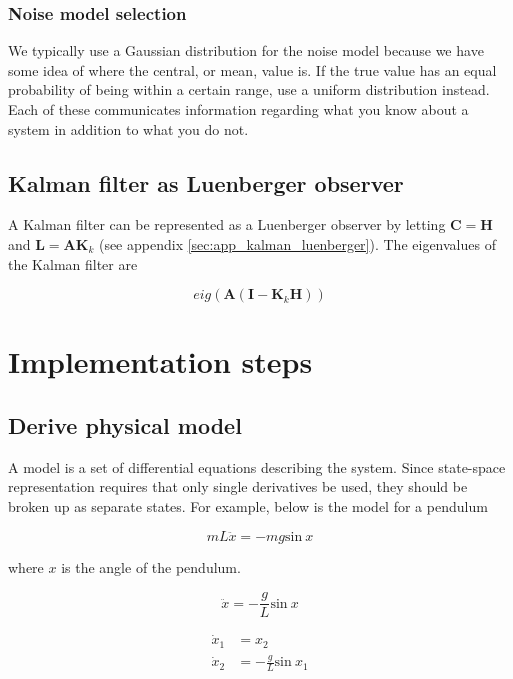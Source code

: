 \documentclass[10pt,conference,compsoc]{IEEEtran}
\newcommand{\mtx}[1] {\bm #1}
\begin{document}
\subsubsection{Noise model selection}

\noindent We typically use a Gaussian distribution for the noise model because
we have some idea of where the central, or mean, value is. If the true value has
an equal probability of being within a certain range, use a uniform distribution
instead. Each of these communicates information regarding what you know about a
system in addition to what you do not.

\subsection{Kalman filter as Luenberger observer}

\noindent A Kalman filter can be represented as a Luenberger observer by letting
$\mtx{C} = \mtx{H}$ and $\mtx{L} = \mtx{A} \mtx{K}_k$ (see appendix
\ref{sec:app_kalman_luenberger}). The eigenvalues of the Kalman filter are

\begin{equation}
  eig(\mtx{A}(\mtx{I} - \mtx{K}_k\mtx{H}))
\end{equation}

\section{Implementation steps}

\subsection{Derive physical model}

\noindent A model is a set of differential equations describing the system.
Since state-space representation requires that only single derivatives be used,
they should be broken up as separate states. For example, below is the model for
a pendulum

\begin{equation}
  mL\ddot{x} = -mg \mathrm{sin}~x
\end{equation}

\noindent where $x$ is the angle of the pendulum.

\begin{equation*}
  \ddot{x} = -\frac{g}{L} \mathrm{sin}~x
\end{equation*}

\begin{align*}
  \dot{x}_1 &= x_2 \\
  \dot{x}_2 &= -\frac{g}{L} \mathrm{sin}~x_1
\end{align*}
\end{document}
